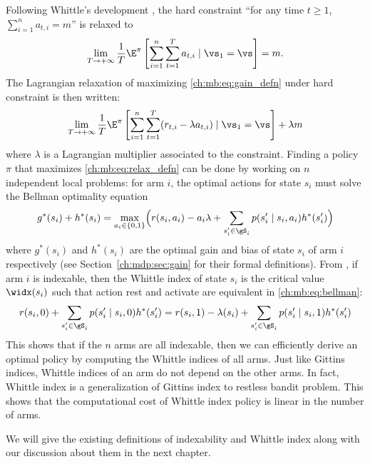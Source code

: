 Following Whittle's development \cite{whittle1988restless}, the hard constraint ``for any time $t\ge1$, $\sum_{i=1}^{n}a_{t,i}=m$'' is relaxed to
\begin{align*}
    \lim_{T\to+\infty}\frac1T \E^\pi\left[\sum_{i=1}^n \sum_{t=1}^{T} a_{t,i} \mid \vs_1=\vs\right]=m.
\end{align*}
The Lagrangian relaxation of maximizing \eqref{ch:mb:eq:gain_defn} under hard constraint is then written:
\begin{align}
    \lim_{T\to+\infty}\frac1T \E^\pi\left[\sum_{i=1}^n \sum_{t=1}^{T} (r_{t,i} -\lambda a_{t,i}) \mid \vs_1=\vs\right] +\lambda m \label{ch:mb:eq:relax_defn}
\end{align}
where $\lambda$ is a Lagrangian multiplier associated to the constraint.
Finding a policy $\pi$ that maximizes \eqref{ch:mb:eq:relax_defn} can be done by working on $n$ independent local problems:
for arm $i$, the optimal actions for state $s_i$ must solve the Bellman optimality equation
\begin{align}
    g^*(s_i) +h^*(s_i) =\max_{a_i\in\{0,1\}} \Bigl(r(s_i,a_i)-a_i\lambda +\sum_{s'_i\in\gS_i}p(s'_i\mid s_i,a_i)h^*(s'_i)\Bigr) \label{ch:mb:eq:bellman}
\end{align}
where $g^*(s_i)$ and $h^*(s_i)$ are the optimal gain and bias of state $s_i$ of arm $i$ respectively (see Section~\ref{ch:mdp:sec:gain} for their formal definitions).
From \cite{whittle1988restless,whittle1996optimal}, if arm $i$ is indexable, then the Whittle index of state $s_i$ is the critical value $\widx(s_i)$ such that action rest and activate are equivalent in \eqref{ch:mb:eq:bellman}:
\begin{align}
    r(s_i,0) +\sum_{s'_i\in\gS_i}p(s'_i\mid s_i,0)h^*(s'_i)
    =r(s_i,1)-\lambda(s_i) +\sum_{s'_i\in\gS_i}p(s'_i\mid s_i,1)h^*(s'_i) \label{ch:mb:eq:widx}
\end{align}
This shows that if the $n$ arms are all indexable, then we can efficiently derive an optimal policy by computing the Whittle indices of all arms.
Just like Gittins indices, Whittle indices of an arm do not depend on the other arms.
In fact, Whittle index is a generalization of Gittins index to restless bandit problem.
This shows that the computational cost of Whittle index policy is linear in the number of arms.

We will give the existing definitions of indexability and Whittle index along with our discussion about them in the next chapter.

